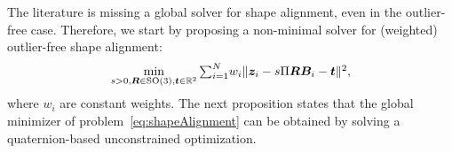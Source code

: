 The literature is missing a global solver for shape alignment, even in the outlier-free case. Therefore, we start by proposing a 
 non-minimal solver for (weighted) outlier-free shape alignment: %
\begin{equation} \label{eq:shapeAlignment}
\min_{s>0, \MR \in \SOthree, \vt \in \Real{2}} \textstyle{\sumAllPointsi} w_i \| \vz_i - s\Pi\MR \MB_i - \vt \|^2, %
\end{equation}
where $w_i$ are constant weights.
The next proposition states that the global minimizer of problem~\eqref{eq:shapeAlignment} can be obtained by solving a quaternion-based unconstrained optimization.

